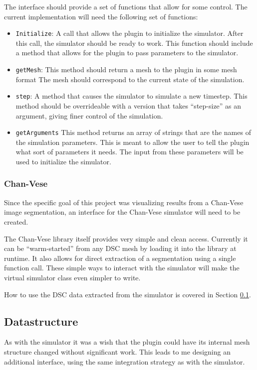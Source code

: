 The interface should provide a set of functions that allow for some control.
The current implementation will need the following set of functions:
\begin{itemize}
  \item \texttt{Initialize}: A call that allows the plugin to initialize the
    simulator. After this call, the simulator should be ready to work. This
    function should include a method that allows for the plugin to pass
    parameters to the simulator.
  \item \texttt{getMesh}: This method should return a mesh to the plugin in some
    mesh format The mesh should correspond to the current state of the
    simulation.
  \item \texttt{step}: A method that causes the simulator to simulate a new
    timestep. This method should be overrideable with a version that takes
    ``step-size'' as an argument, giving finer control of the simulation.
  \item \texttt{getArguments} This method returns an array of strings that are
    the names of the simulation parameters. This is meant to allow the user to
    tell the plugin what sort of parameters it needs. The input from these
    parameters will be used to initialize the simulator.
\end{itemize}

\subsubsection{Chan-Vese}
Since the specific goal of this project was visualizing results from a Chan-Vese
image segmentation, an interface for the Chan-Vese simulator will need to be
created.

The Chan-Vese library itself provides very simple and clean access. Currently it
can be ``warm-started'' from any DSC mesh by loading it into the library at
runtime. It also allows for direct extraction of a segmentation using a single
function call. These simple ways to interact with the simulator will make
the virtual simulator class even simpler to write.

How to use the DSC data extracted from the simulator is covered in Section
\ref{sec:data}.

\subsection{Datastructure}
\label{sec:data}
As with the simulator it was a wish that the plugin could have its internal mesh
structure changed without significant work. This leads to me designing an
additional interface, using the same integration strategy as with the simulator.

